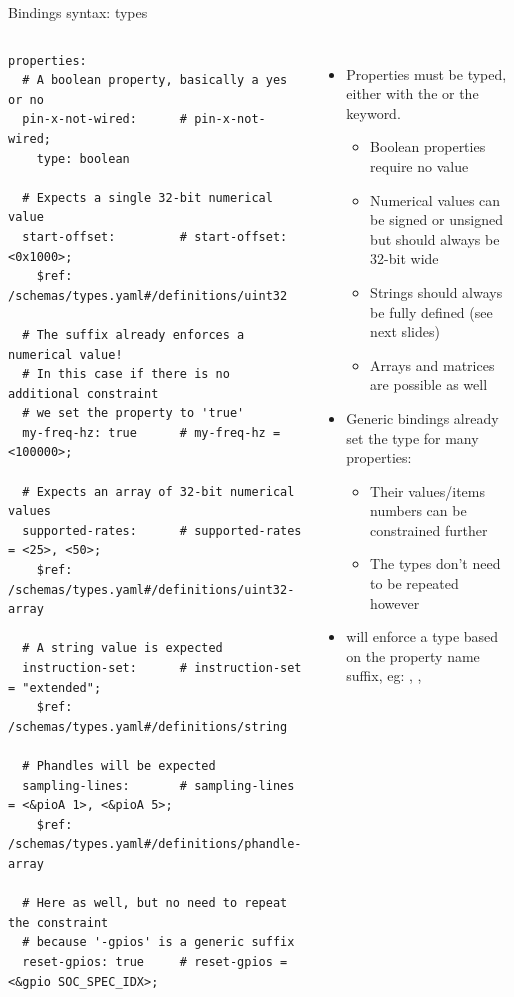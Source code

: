 \begin{frame}[fragile]{Bindings syntax: types}
  \begin{columns}
    \begin{block}{}
      {\fontsize{5}{6}\selectfont
\begin{verbatim}
properties:
  # A boolean property, basically a yes or no
  pin-x-not-wired:      # pin-x-not-wired;
    type: boolean

  # Expects a single 32-bit numerical value
  start-offset:         # start-offset: <0x1000>;
    $ref: /schemas/types.yaml#/definitions/uint32

  # The suffix already enforces a numerical value!
  # In this case if there is no additional constraint
  # we set the property to 'true'
  my-freq-hz: true      # my-freq-hz = <100000>;

  # Expects an array of 32-bit numerical values
  supported-rates:      # supported-rates = <25>, <50>;
    $ref: /schemas/types.yaml#/definitions/uint32-array

  # A string value is expected
  instruction-set:      # instruction-set = "extended";
    $ref: /schemas/types.yaml#/definitions/string

  # Phandles will be expected
  sampling-lines:       # sampling-lines = <&pioA 1>, <&pioA 5>;
    $ref: /schemas/types.yaml#/definitions/phandle-array

  # Here as well, but no need to repeat the constraint
  # because '-gpios' is a generic suffix
  reset-gpios: true     # reset-gpios = <&gpio SOC_SPEC_IDX>;
\end{verbatim}
      }
    \end{block}
    \begin{itemize}
    \item Properties must be typed, either with the  or the
       keyword.
      \begin{itemize}
      \item Boolean properties require no value
      \item Numerical values can be signed or unsigned but should always
        be 32-bit wide
      \item Strings should always be fully defined (see next slides)
      \item Arrays and matrices are possible as well
      \end{itemize}
    \item Generic bindings already set the type for many properties:
      \begin{itemize}
      \item Their values/items numbers can be constrained further
      \item The types don't need to be repeated however
      \end{itemize}
    \item {} will enforce a type based on the property
      name suffix, eg: , , 
    \end{itemize}
  \end{columns}
\end{frame}

